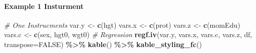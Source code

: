 \documentclass[
]{book}
\newenvironment{Shaded}{\begin{snugshade}}{\end{snugshade}}
\newcommand{\CommentTok}[1]{\textcolor[rgb]{0.56,0.35,0.01}{\textit{#1}}}
\newcommand{\DataTypeTok}[1]{\textcolor[rgb]{0.13,0.29,0.53}{#1}}
\newcommand{\KeywordTok}[1]{\textcolor[rgb]{0.13,0.29,0.53}{\textbf{#1}}}
\newcommand{\NormalTok}[1]{#1}
\newcommand{\OperatorTok}[1]{\textcolor[rgb]{0.81,0.36,0.00}{\textbf{#1}}}
\newcommand{\OtherTok}[1]{\textcolor[rgb]{0.56,0.35,0.01}{#1}}
\newcommand{\StringTok}[1]{\textcolor[rgb]{0.31,0.60,0.02}{#1}}
\begin{document}
\hypertarget{example-1-insturment}{%
\paragraph{Example 1 Insturment}\label{example-1-insturment}}

\begin{Shaded}
\begin{Highlighting}[]
\CommentTok{\# One Instrucments}
\NormalTok{var.y \textless{}{-}}\StringTok{ }\KeywordTok{c}\NormalTok{(}\StringTok{\textquotesingle{}hgt\textquotesingle{}}\NormalTok{)}
\NormalTok{vars.x \textless{}{-}}\StringTok{ }\KeywordTok{c}\NormalTok{(}\StringTok{\textquotesingle{}prot\textquotesingle{}}\NormalTok{)}
\NormalTok{vars.z \textless{}{-}}\StringTok{ }\KeywordTok{c}\NormalTok{(}\StringTok{\textquotesingle{}momEdu\textquotesingle{}}\NormalTok{)}
\NormalTok{vars.c \textless{}{-}}\StringTok{ }\KeywordTok{c}\NormalTok{(}\StringTok{\textquotesingle{}sex\textquotesingle{}}\NormalTok{, }\StringTok{\textquotesingle{}hgt0\textquotesingle{}}\NormalTok{, }\StringTok{\textquotesingle{}wgt0\textquotesingle{}}\NormalTok{)}
\CommentTok{\# Regression}
\KeywordTok{regf.iv}\NormalTok{(var.y, vars.x, vars.c, vars.z, df, }\DataTypeTok{transpose=}\OtherTok{FALSE}\NormalTok{) }\OperatorTok{\%\textgreater{}\%}
\StringTok{  }\KeywordTok{kable}\NormalTok{() }\OperatorTok{\%\textgreater{}\%}
\StringTok{  }\KeywordTok{kable\_styling\_fc}\NormalTok{()}
\end{Highlighting}
\end{Shaded}
\end{document}
